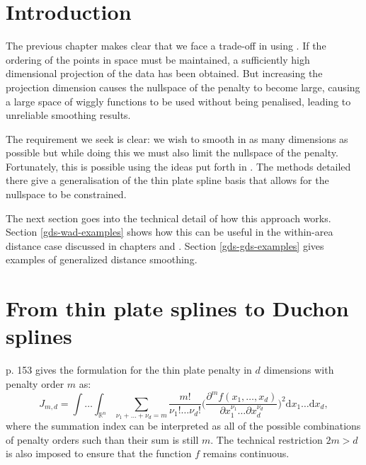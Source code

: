 
\label{chap-gds}


\section{Introduction}

The previous chapter makes clear that we face a trade-off in using \mdsap. If the ordering of the points in space must be maintained, a sufficiently high dimensional projection of the data has been obtained. But increasing the projection dimension causes the nullspace of the penalty to become large, causing a large space of wiggly functions to be used without being penalised, leading to unreliable smoothing results. 

The requirement we seek is clear: we wish to smooth in as many dimensions as possible but while doing this we must also limit the nullspace of the penalty. Fortunately, this is possible using the ideas put forth in \cite{duchon77}. The methods detailed there give a generalisation of the thin plate spline basis that allows for the nullspace to be constrained.

The next section goes into the technical detail of how this approach works. Section \ref{gds-wad-examples} shows how this can be useful in the within-area distance case discussed in chapters \label{chap-sc} and \label{chap-mds}. Section \ref{gds-gds-examples} gives examples of generalized distance smoothing.

\section{From thin plate splines to Duchon splines}

\cite{simonbook} p. 153 gives the formulation for the thin plate penalty in $d$ dimensions with penalty order $m$ as:
\begin{equation}
J_{m,d} = \int \ldots \int_{\mathbb{R}^n} \sum_{\nu_1 + \dots + \nu_d=m} \frac{m!}{\nu_1! \dots \nu_d!}\Big( \frac{\partial^m f(x_1,\dots,x_d)}{\partial x_1^{\nu_1} \ldots  \partial x_d^{\nu_d}} \Big)^2 \text{d} x_1 \ldots  \text{d} x_d,
\label{tprs-pen}
\end{equation}
where the summation index can be interpreted as all of the possible combinations of penalty orders such than their sum is still $m$. The technical restriction $2m>d$ is also imposed to ensure that the function $f$ remains continuous.

